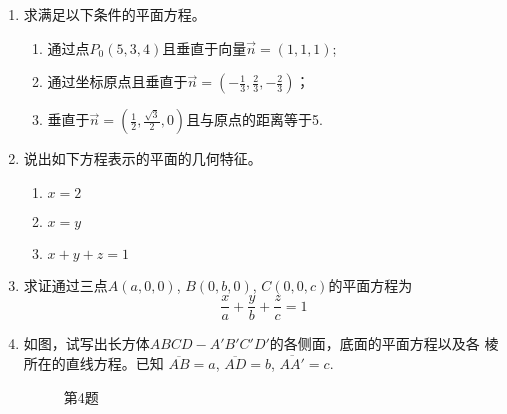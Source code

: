 \begin{enumerate}
    \item 求满足以下条件的平面方程。
\begin{enumerate}
\item 通过点$P_0(5,3,4)$且垂直于向量$\vec{n}=(1,1,1)$;
\item 通过坐标原点且垂直于$\vec{n}=\left(-\frac{1}{3},\frac{2}{3},-\frac{2}{3}\right)$；
\item 垂直于$\vec{n}=\left(\frac{1}{2},\frac{\sqrt{3}}{2},0\right)$且与原点的距离等于5.
\end{enumerate}

    \item 说出如下方程表示的平面的几何特征。
\begin{multicols}{3}
\begin{enumerate}
    \item $x=2$ \item $x=y$ \item $x+y+z=1$
\end{enumerate}
\end{multicols}

    \item 求证通过三点$A(a,0,0)$, $B(0,b,0)$, $C(0,
    0,c)$的平面方程为
\[\frac{x}{a}+\frac{y}{b}+\frac{z}{c}=1\] 

\item 如图，试写出长方体$ABC
D-A'B'C'D'$的各侧面，底面的平面方程以及各
棱所在的直线方程。已知
$\overline{AB}=a$, $\overline{AD}=b$, 
$\overline{AA'}=c$.

\begin{figure}[htp]
    \centering
{}
    \caption*{第4题}
\end{figure}



\end{enumerate}
